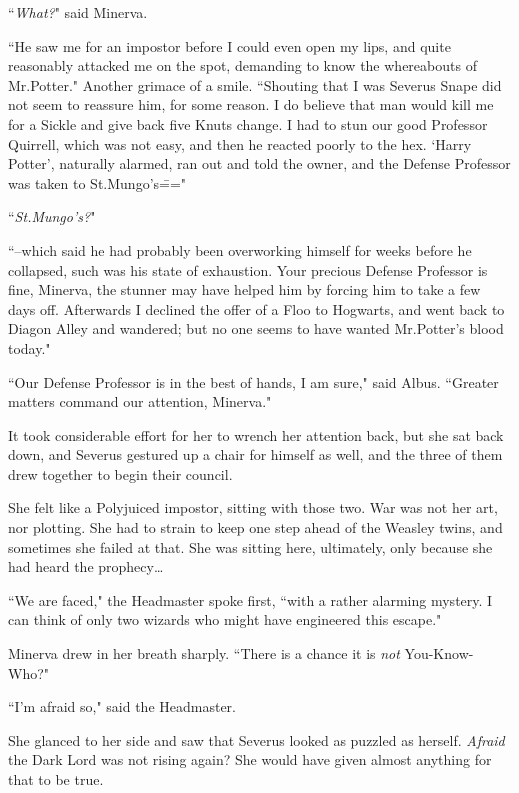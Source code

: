 ``\emph{What?}" said Minerva.

``He saw me for an impostor before I could even open my lips, and quite reasonably attacked me on the spot, demanding to know the whereabouts of Mr.\?Potter." Another grimace of a smile. ``Shouting that I was Severus Snape did not seem to reassure him, for some reason. I do believe that man would kill me for a Sickle and give back five Knuts change. I had to stun our good Professor Quirrell, which was not easy, and then he reacted poorly to the hex. `Harry Potter', naturally alarmed, ran out and told the owner, and the Defense Professor was taken to St.\?Mungo's\==="

``\emph{St.\?Mungo's?}"

``\---which said he had probably been overworking himself for weeks before he collapsed, such was his state of exhaustion. Your precious Defense Professor is fine, Minerva, the stunner may have helped him by forcing him to take a few days off. Afterwards I declined the offer of a Floo to Hogwarts, and went back to Diagon Alley and wandered; but no one seems to have wanted Mr.\?Potter's blood today."

``Our Defense Professor is in the best of hands, I am sure," said Albus. ``Greater matters command our attention, Minerva."

It took considerable effort for her to wrench her attention back, but she sat back down, and Severus gestured up a chair for himself as well, and the three of them drew together to begin their council.

She felt like a Polyjuiced impostor, sitting with those two. War was not her art, nor plotting. She had to strain to keep one step ahead of the Weasley twins, and sometimes she failed at that. She was sitting here, ultimately, only because she had heard the prophecy{\ldots}

``We are faced," the Headmaster spoke first, ``with a rather alarming mystery. I can think of only two wizards who might have engineered this escape."

Minerva drew in her breath sharply. ``There is a chance it is \emph{not} You-Know-Who?"

``I'm afraid so," said the Headmaster.

She glanced to her side and saw that Severus looked as puzzled as herself. \emph{Afraid} the Dark Lord was not rising again? She would have given almost anything for that to be true.

